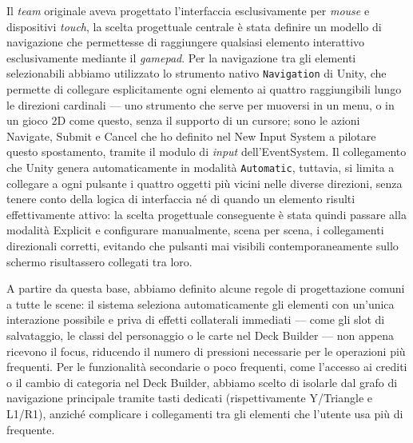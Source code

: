 Il \textit{team} originale aveva progettato l'interfaccia esclusivamente per \textit{mouse} e dispositivi \textit{touch}, la scelta progettuale centrale è stata definire un modello di navigazione che permettesse di raggiungere qualsiasi elemento interattivo esclusivamente mediante il \textit{gamepad}. Per la navigazione tra gli elementi selezionabili abbiamo utilizzato lo strumento nativo \texttt{Navigation} di Unity, che permette di collegare esplicitamente ogni elemento ai quattro raggiungibili lungo le direzioni cardinali — uno strumento che serve per muoversi in un menu, o in un gioco 2D come questo, senza il supporto di un cursore; sono le azioni Navigate, Submit e Cancel che ho definito nel New Input System a pilotare questo spostamento, tramite il modulo di \textit{input} dell'EventSystem. Il collegamento che Unity genera automaticamente in modalità \texttt{Automatic}, tuttavia, si limita a collegare a ogni pulsante i quattro oggetti più vicini nelle diverse direzioni, senza tenere conto della logica di interfaccia né di quando un elemento risulti effettivamente attivo: la scelta progettuale conseguente è stata quindi passare alla modalità Explicit e configurare manualmente, scena per scena, i collegamenti direzionali corretti, evitando che pulsanti mai visibili contemporaneamente sullo schermo risultassero collegati tra loro.
 
A partire da questa base, abbiamo definito alcune regole di progettazione comuni a tutte le scene: il sistema seleziona automaticamente gli elementi con un'unica interazione possibile e priva di effetti collaterali immediati — come gli slot di salvataggio, le classi del personaggio o le carte nel Deck Builder — non appena ricevono il focus, riducendo il numero di pressioni necessarie per le operazioni più frequenti. Per le funzionalità secondarie o poco frequenti, come l'accesso ai crediti o il cambio di categoria nel Deck Builder, abbiamo scelto di isolarle dal grafo di navigazione principale tramite tasti dedicati (rispettivamente Y/Triangle e L1/R1), anziché complicare i collegamenti tra gli elementi che l'utente usa più di frequente.
 

